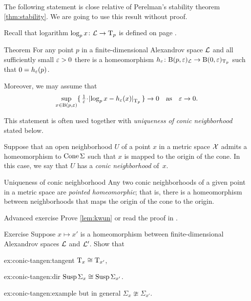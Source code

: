 The following statement \cite{perelman:morse} is close relative of Perelman's stability theorem \ref{thm:stability}.
We are going to use this result without proof.

Recall that logarithm $\log_px\colon\mathcal{L}\to \mathrm{T}_p$ is defined on page \pageref{page:log}.

\begin{thm}{Theorem}\label{thm:spherical-nbhd}
For any point $p$ in a finite-dimensional Alexandrov space $\mathcal{L}$
and all sufficiently small $\varepsilon>0$
there is a homeomorphism $h_\varepsilon\colon\mathrm{B}{}(p,\varepsilon)_{\mathcal{L}}\to \mathrm{B}{}(0,\varepsilon)_{\mathrm{T}_p}$ such that $0=h_\varepsilon(p)$.

Moreover, we may assume that 
\[
\sup_{x\in \oBall(p,\eps)}\{\,\tfrac1\eps\cdot\dist{\log_px}{h_\eps(x)}{\T_p}\,\}\to 0
\quad\text{as}\quad
\eps\to 0.\]
\end{thm}

This statement is often used together with \textit{uniqueness of conic neighborhood} stated below.

Suppose that an open  neighborhood $U$ of a point $x$ in a metric space $\mathcal{X}$
admits a homeomorphism to $\mathop{\rm Cone}\nolimits\Sigma$ such that $x$ is mapped to the origin of the cone.
In this case, we say that $U$ has a \emph{conic neighborhood} of~$x$.

\begin{thm}{Uniqueness of conic neighborhood}\label{lem:kwun}
Any two conic neighborhoods of a given point in a metric space are \emph{pointed homeomorphic}; that is, there is a homeomorphism between neighborhoods that maps the origin of the cone to the origin.
\end{thm}

\begin{thm}{Advanced exercise}\label{ex:conic}
Prove \ref{lem:kwun} or read the proof in \cite{kwun1964}.
\end{thm}


\begin{thm}{Exercise}\label{ex:conic-tangent}
Suppose $x\mapsto x'$ is a homeomorphism between finite-dimensional Alexandrov spaces $\mathcal{L}$ and $\mathcal{L}'$. Show that 

\begin{subthm}{ex:conic-tangen:tangent}
$\mathrm{T}_x\cong \mathrm{T}_{x'}$,
\end{subthm}

\begin{subthm}{ex:conic-tangen:dir}
$\mathop{\rm Susp}\nolimits\Sigma_x\cong \mathop{\rm Susp}\nolimits\Sigma_{x'}$.
\end{subthm}

\begin{subthm}{ex:conic-tangen:example}
but in general $\Sigma_x\ncong\Sigma_{x'}$.
\end{subthm}

\end{thm}



